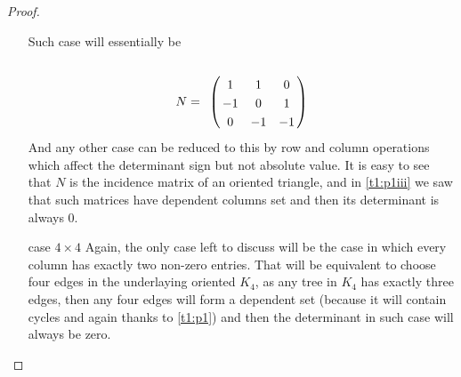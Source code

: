 \begin{proof}
\begin{itemize}
            Such case will essentially be
            \begin{align}
                N =
                    \bordermatrix{
                            &       &       &       \cr
                            &   1   &   1   &   0   \cr
                            &  -1   &   0   &   1   \cr
                            &   0   &  -1   &  -1
                    }    
            \end{align}
            And any other case can be reduced to this by row and column operations which affect the determinant sign but not absolute value.
            It is easy to see that $N$ is the incidence matrix of an oriented triangle, and in \ref{t1:p1iii} we saw that such matrices have
            dependent columns set and then its determinant is always $0$.
            
        \item [case $4 \times 4$]
            Again, the only case left to discuss will be the case in which every column has exactly two non-zero entries. That will be equivalent
            to choose four edges in the underlaying oriented $K_4$, as any tree in $K_4$ has exactly three edges, then any four edges will form
            a dependent set (because it will contain cycles and again thanks to \ref{t1:p1}) and then the determinant in such case will always be zero.
    \end{itemize}
\end{proof}